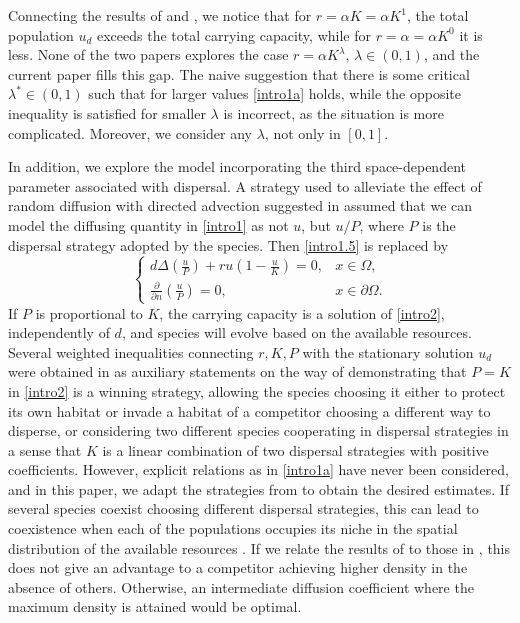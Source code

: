 \documentclass[11pt]{article}
\newcommand{\parentheses}[1]{\left(#1\right)}
\theoremstyle{definition}
\theoremstyle{remark}
\begin{document}
Connecting the results of \cite{Lou}  and \cite{Guo_2020}, we notice that for $r=\alpha K=\alpha K^1$, the total population $u_d$ exceeds the total carrying capacity, 
while for $r=\alpha =\alpha K^0$ it is less. None of the two papers explores the case $r=\alpha K^{\lambda}$, $\lambda \in (0,1)$,
and the current paper fills this gap. The naive suggestion that there is some critical $\lambda^{\ast}  \in (0,1)$  such that for larger values \eqref{intro1a} holds,
while the opposite inequality is satisfied for smaller $\lambda$ is incorrect, as the situation is more complicated.
Moreover, we consider any $\lambda$, not only in $[0,1]$.

In addition, we explore the model incorporating the third space-dependent parameter associated with dispersal. 
A strategy used to alleviate the effect of random diffusion with directed advection suggested in \cite{Brav} assumed that we can model the diffusing quantity in \eqref{intro1} as not $u$, but $u/P$, where $P$ is the dispersal strategy adopted by the species. Then \eqref{intro1.5} is  replaced by
\begin{equation}\label{intro2}
    \begin{cases}
  \displaystyle       d\Delta\parentheses{\frac{u}{P}}+ru\parentheses{1-\frac{u}{K}}=0, & x \in \Omega,  \\
  \displaystyle            \frac{\partial}{\partial n}\parentheses{\frac{u}{P}}=0,  & x \in \partial\Omega.
    \end{cases} 
\end{equation} 
If $P$ is proportional to $K$, the carrying capacity is a solution of \eqref{intro2}, independently of $d$, and species will evolve based on the available resources.
Several weighted inequalities connecting $r,K,P$ with the stationary solution $u_d$ were obtained in \cite{CAMWA2016,Korobenko2012,Korobenko2014}
as auxiliary statements on the way of demonstrating that $P=K$ in \eqref{intro2} is a winning strategy, allowing the species choosing it either to protect its own habitat or invade a habitat of a competitor  choosing a different way to disperse, or considering two different species cooperating in dispersal strategies in a sense that $K$ is a linear combination of two dispersal strategies with positive coefficients. However, explicit relations as in \eqref{intro1a} have never been considered, and in this paper, we adapt the strategies from \cite{Ang2016} to obtain the desired estimates. If several species coexist choosing different dispersal strategies, this can lead to coexistence when each of the populations occupies its niche in the spatial distribution of the available resources \cite{Averill,CAMWA2016}.
If we relate the results of \cite{Dockery} to those in \cite{Lou}, this does not give an advantage to a competitor achieving higher density in the absence of others.
Otherwise, an intermediate diffusion coefficient where the maximum density is attained would be optimal.
\end{document}
